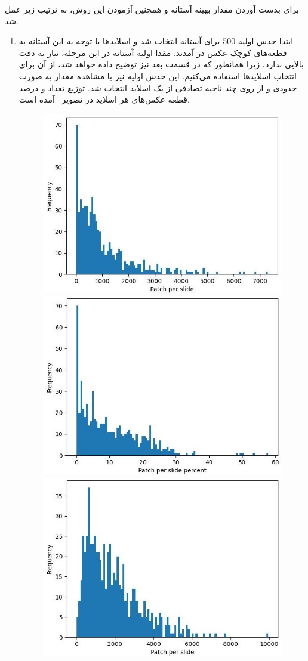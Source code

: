 برای بدست آوردن مقدار بهینه آستانه و همچنین آزمودن این روش، به ترتیب زیر عمل شد.
\begin{enumerate}
    \item ابتدا حدس اولیه 500 برای آستانه انتخاب شد و اسلاید‌ها با توجه به این آستانه به قطعه‌های کوچک عکس در آمدند.
    مقدا اولیه آستانه در این مرحله، نیاز به دقت بالایی ندارد، زیرا همانطور که در قسمت بعد نیز توضیح داده خواهد شد، از آن برای انتخاب اسلاید‌ها استفاده می‌کنیم.
    این حدس اولیه نیز با مشاهده مقدار به صورت حدودی و از روی چند ناحیه تصادفی از یک اسلاید انتخاب شد.
    توزیع تعداد و درصد قطعه عکس‌های هر اسلاید در تصویر~ آمده است.
    \begin{figure}
        \begin{center}
            \includegraphics[width=0.48\linewidth]{figs/introduction/subs/challenges/patch_distribution_old_500_threshold.jpeg}
            \includegraphics[width=0.48\linewidth]{figs/introduction/subs/challenges/patch_percent_distribution_old_threshold_500.jpeg}
            \hspace{.2cm}
            \includegraphics[width=0.48\linewidth]{figs/introduction/subs/challenges/patch_distribution_new_298_threshold.jpeg}

\end{center}
\end{figure}
\end{enumerate}
